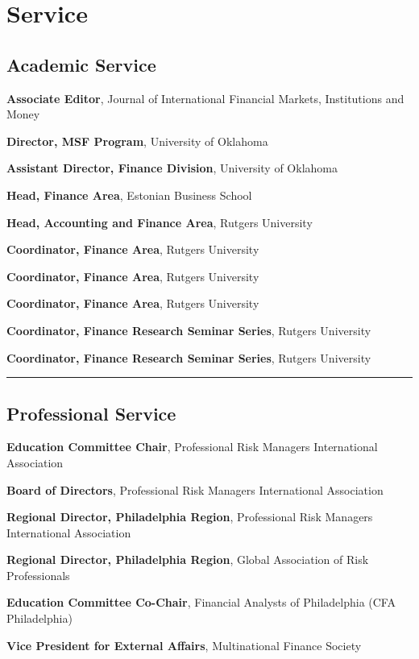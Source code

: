 \documentclass[11pt,a4paper,]{awesome-cv}
\begin{document}
\section{Service}\label{service}

\subsection{Academic Service}

\textbf{Associate Editor}, Journal of International Financial Markets,
Institutions and Money

\textbf{Director, MSF Program}, University of Oklahoma

\textbf{Assistant Director, Finance Division}, University of Oklahoma

\textbf{Head, Finance Area}, Estonian Business School

\textbf{Head, Accounting and Finance Area}, Rutgers University

\textbf{Coordinator, Finance Area}, Rutgers University

\textbf{Coordinator, Finance Area}, Rutgers University

\textbf{Coordinator, Finance Area}, Rutgers University

\textbf{Coordinator, Finance Research Seminar Series}, Rutgers
University

\textbf{Coordinator, Finance Research Seminar Series}, Rutgers
University

\vspace{0.3cm}\hrule\vspace{0.3cm}
\subsection{Professional Service}

\textbf{Education Committee Chair}, Professional Risk Managers
International Association

\textbf{Board of Directors}, Professional Risk Managers International
Association

\textbf{Regional Director, Philadelphia Region}, Professional Risk
Managers International Association

\textbf{Regional Director, Philadelphia Region}, Global Association of
Risk Professionals

\textbf{Education Committee Co-Chair}, Financial Analysts of
Philadelphia (CFA Philadelphia)

\textbf{Vice President for External Affairs}, Multinational Finance
Society
\end{document}
